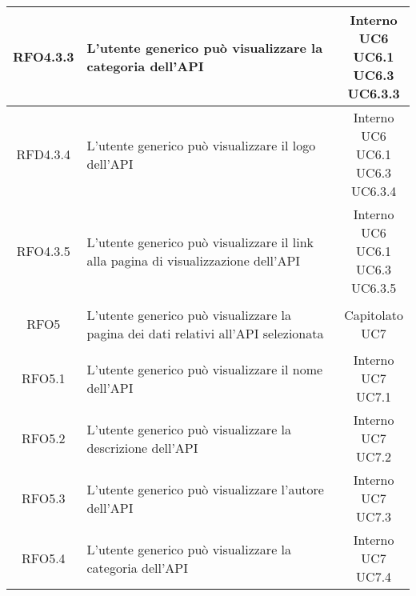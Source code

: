 \begin{longtable}{|c|p{8cm}|c|}
\hypertarget{RFO4.3.3}{RFO4.3.3} & L'utente generico può visualizzare la categoria dell'API & \makecell*{Interno\\UC6\\UC6.1\\UC6.3\\UC6.3.3} \\
\hline
\hypertarget{RFD4.3.4}{RFD4.3.4} & L'utente generico può visualizzare il logo dell'API & \makecell*{Interno\\UC6\\UC6.1\\UC6.3\\UC6.3.4} \\
\hline
\hypertarget{RFO4.3.5}{RFO4.3.5} & L'utente generico può visualizzare il link alla pagina di visualizzazione dell'API & \makecell*{Interno\\UC6\\UC6.1\\UC6.3\\UC6.3.5} \\
\hline

\hypertarget{RFO5}{RFO5} & L'utente generico può visualizzare la pagina dei dati relativi all'API selezionata & \makecell*{Capitolato\\UC7} \\
\hline

\hypertarget{RFO5.1}{RFO5.1} & L'utente generico può visualizzare il nome dell'API & \makecell*{Interno\\UC7\\UC7.1} \\
\hline
\hypertarget{RFO5.2}{RFO5.2} & L'utente generico può visualizzare la descrizione dell'API & \makecell*{Interno\\UC7\\UC7.2} \\
\hline
\hypertarget{RFO5.3}{RFO5.3} & L'utente generico può visualizzare l'autore dell'API & \makecell*{Interno\\UC7\\UC7.3} \\
\hline
\hypertarget{RFO5.4}{RFO5.4} & L'utente generico può visualizzare la categoria dell'API & \makecell*{Interno\\UC7\\UC7.4} \\
\hline


\end{longtable}
